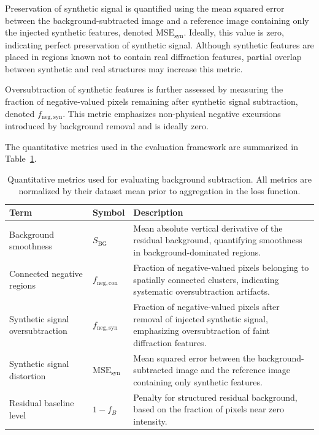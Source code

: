 \documentclass[iucr]{iucrjournals}
\begin{document}
Preservation of synthetic signal is quantified using the mean squared error between the background-subtracted image and a reference image containing only the injected synthetic features, denoted $\mathrm{MSE}_{\mathrm{syn}}$. Ideally, this value is zero, indicating perfect preservation of synthetic signal.
Although synthetic features are placed in regions known not to contain real diffraction features, partial overlap between synthetic and real structures may increase this metric.


Oversubtraction of synthetic features is further assessed by measuring the fraction of negative-valued pixels remaining after synthetic signal subtraction, denoted $f_{\mathrm{neg,syn}}$. This metric emphasizes non-physical negative excursions introduced by background removal and is ideally zero.

The quantitative metrics used in the evaluation framework are summarized in Table~\ref{tab:loss_terms}.

\begin{table}[t]
\caption{Quantitative metrics used for evaluating background subtraction. 
All metrics are normalized by their dataset mean prior to aggregation in the loss function.}
\label{tab:loss_terms}
\centering
\small
\setlength{\tabcolsep}{6pt}
\renewcommand{\arraystretch}{1.1}
\begin{tabular}{@{}llp{7cm}@{}}
\toprule
\textbf{Term} & \textbf{Symbol} & \textbf{Description} \\
\midrule
Background smoothness & $S_{\mathrm{BG}}$ & Mean absolute vertical derivative of the residual background, quantifying smoothness in background-dominated regions. \\
Connected negative regions & $f_{\mathrm{neg,con}}$ & Fraction of negative-valued pixels belonging to spatially connected clusters, indicating systematic oversubtraction artifacts. \\
Synthetic signal oversubtraction & $f_{\mathrm{neg,syn}}$ & Fraction of negative-valued pixels after removal of injected synthetic signal, emphasizing oversubtraction of faint diffraction features. \\
Synthetic signal distortion & $\mathrm{MSE}_{\mathrm{syn}}$ & Mean squared error between the background-subtracted image and the reference image containing only synthetic features. \\
Residual baseline level & $1 - f_{B}$ & Penalty for structured residual background, based on the fraction of pixels near zero intensity. \\
\bottomrule
\end{tabular}
\end{table}
\end{document}

